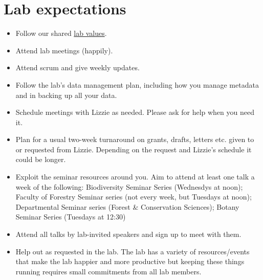 \documentclass[11pt,a4paper,oneside]{article}
\begin{document}
\section{Lab expectations}
\begin{itemize}
\item Follow our shared \href{https://github.com/temporalecologylab/labgit/blob/master/expectations/values_aspirations.pdf}{lab values}.
\item Attend lab meetings (happily). %
\item Attend scrum and give weekly updates. 
\item Follow the lab's data management plan, including how you manage metadata and in backing up all your data.
\item Schedule meetings with Lizzie as needed. Please ask for help when you need it.
\item Plan for a usual two-week turnaround on grants, drafts, letters etc. given to or requested from Lizzie. Depending on the request and Lizzie's schedule it could be longer.
\item Exploit the seminar resources around you. Aim to attend at least one talk a week of the following: Biodiversity Seminar Series (Wednesdys at noon); Faculty of Forestry Seminar series (not every week, but Tuesdays at noon); Departmental Seminar series (Forest \& Conservation Sciences); Botany Seminar Series (Tuesdays at 12:30)  %
\item Attend all talks by lab-invited speakers and sign up to meet with them. 
\item Help out as requested in the lab. The lab has a variety of resources/events that make the lab happier and more productive but keeping these things running requires small commitments from all lab members. 


\end{itemize}
\end{document}
